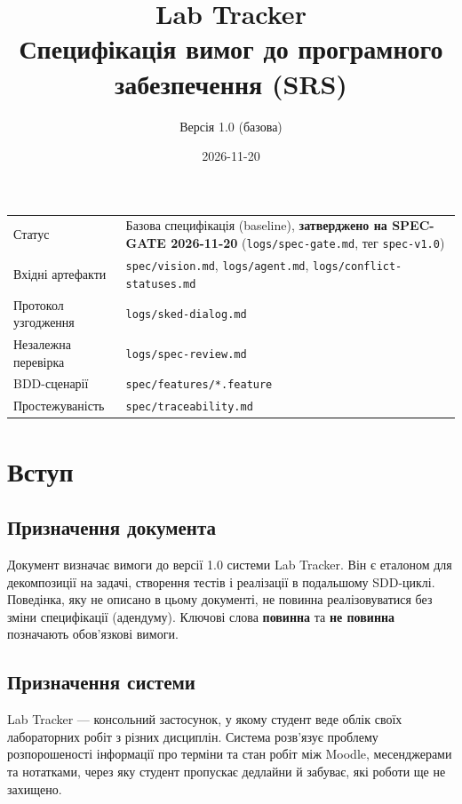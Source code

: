 \documentclass[12pt,a4paper]{article}
\title{Lab Tracker\\\large Специфікація вимог до програмного забезпечення (SRS)}
\author{Версія 1.0 (базова)}
\date{2026-11-20}
\newcommand{\code}[1]{\texttt{#1}}
\begin{document}
\maketitle

\begin{center}
\begin{tabular}{p{} p{}}
Статус & Базова специфікація (baseline), \textbf{затверджено на SPEC-GATE 2026-11-20} (\code{logs/spec-gate.md}, тег \code{spec-v1.0}) \\
Вхідні артефакти & \code{spec/vision.md}, \code{logs/agent.md}, \code{logs/conflict-statuses.md} \\
Протокол узгодження & \code{logs/sked-dialog.md} \\
Незалежна перевірка & \code{logs/spec-review.md} \\
BDD-сценарії & \code{spec/features/*.feature} \\
Простежуваність & \code{spec/traceability.md} \\
\end{tabular}
\end{center}

\tableofcontents

\section{Вступ}

\subsection{Призначення документа}
Документ визначає вимоги до версії 1.0 системи Lab Tracker.
Він є еталоном для декомпозиції на задачі, створення тестів і реалізації в подальшому SDD-циклі.
Поведінка, яку не описано в цьому документі, не повинна реалізовуватися без зміни специфікації (адендуму).
Ключові слова \textbf{повинна} та \textbf{не повинна} позначають обов'язкові вимоги.

\subsection{Призначення системи}
Lab Tracker --- консольний застосунок, у якому студент веде облік своїх лабораторних робіт з різних дисциплін.
Система розв'язує проблему розпорошеності інформації про терміни та стан робіт між Moodle, месенджерами та нотатками, через яку студент пропускає дедлайни й забуває, які роботи ще не захищено.
\end{document}
